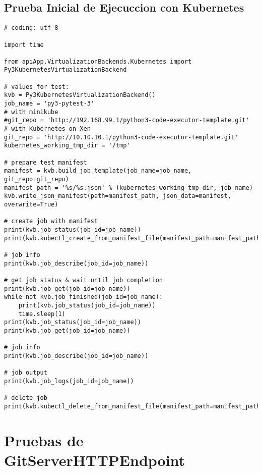 \section{Prueba Inicial de Ejecuccion con Kubernetes}
\lstset{language=Python}
\begin{lstlisting}
# coding: utf-8

import time

from apiApp.VirtualizationBackends.Kubernetes import Py3KubernetesVirtualizationBackend

# values for test:
kvb = Py3KubernetesVirtualizationBackend()
job_name = 'py3-pytest-3'
# with minikube
#git_repo = 'http://192.168.99.1/python3-code-executor-template.git'
# with Kubernetes on Xen
git_repo = 'http://10.10.10.1/python3-code-executor-template.git'
kubernetes_working_tmp_dir = '/tmp'

# prepare test manifest
manifest = kvb.build_job_template(job_name=job_name, git_repo=git_repo)
manifest_path = '%s/%s.json' % (kubernetes_working_tmp_dir, job_name)
kvb.write_json_manifest(path=manifest_path, json_data=manifest, overwrite=True)

# create job with manifest
print(kvb.job_status(job_id=job_name))
print(kvb.kubectl_create_from_manifest_file(manifest_path=manifest_path))

# job info
print(kvb.job_describe(job_id=job_name))

# get job status & wait until job completion
print(kvb.job_get(job_id=job_name))
while not kvb.job_finished(job_id=job_name):
    print(kvb.job_status(job_id=job_name))
    time.sleep(1)
print(kvb.job_status(job_id=job_name))
print(kvb.job_get(job_id=job_name))

# job info
print(kvb.job_describe(job_id=job_name))

# job output
print(kvb.job_logs(job_id=job_name))

# delete job
print(kvb.kubectl_delete_from_manifest_file(manifest_path=manifest_path))
\end{lstlisting}
\lstset{language=Bash}



\chapter{Pruebas de GitServerHTTPEndpoint}
\label{AnexoH}
